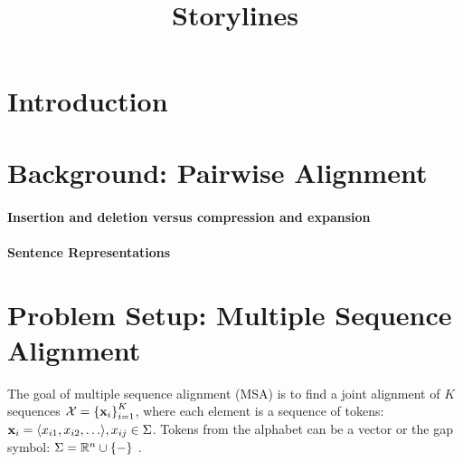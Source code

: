 \documentclass{article}
\title{Storylines}
\begin{document}
\maketitle

\section{Introduction}

\section{Background: Pairwise Alignment}

\paragraph{Insertion and deletion versus compression and expansion}

\paragraph{Sentence Representations}


\section{Problem Setup: Multiple Sequence Alignment}
The goal of multiple sequence alignment (MSA) is to find a joint alignment of $K$ sequences
$\mathcal{X} = \left\{\mathbf{x}_i\right\}_{i=1}^K$, where each element is a sequence of tokens:
$\mathbf{x}_i = \langle x_{i1}, x_{i2}, \ldots \rangle, x_{ij} \in \Sigma$.
Tokens from the alphabet can be a vector or the gap symbol:
$\Sigma = \mathbb{R}^n \cup \left\{-\right\}$ .
\end{document}
